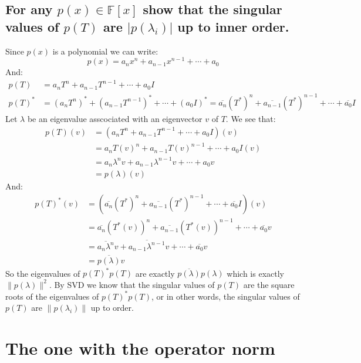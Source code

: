 \documentclass[11pt,a4paper]{article}
\theoremstyle{plain}
\newcommand{\F}{\mathbb{F}}
\begin{document}
	\subsection{For any $p(x)\in\F[x]$ show that the singular values of $p(T)$ 
	are $\vert p(\lambda_i)\vert$ up to inner order.}
	Since $p(x)$ is a polynomial we can write:
	\[
		p(x) = a_nx^n+a_{n-1}x^{n-1}+\cdots+a_0
	\]
	And:
	\begin{align*}
		p(T) &= a_nT^n+a_{n-1}T^{n-1}+\cdots+a_0I \\
		p(T)^* &= (a_nT^n)^* + (a_{n-1}T^{n-1})^* + \cdots + (a_0I)^* = 
		\overline{a_n}(T^*)^n + \overline{a_{n-1}}(T^*)^{n-1} + \cdots + 
		\overline{a_0}I
	\end{align*}
	Let $\lambda$ be an eigenvalue asscociated with an eigenvector $v$ of $T$. 
	We see that:
	\begin{align*}
		p(T)(v) &= (a_nT^n+a_{n-1}T^{n-1}+\cdots+a_0I)(v) \\ &= 
		a_nT(v)^n + a_{n-1}T(v)^{n-1} + \cdots + a_0I(v) \\ &= 
		a_n\lambda^{n}v + a_{n-1}\lambda^{n-1}v + \cdots + a_0v \\ &= 
		p(\lambda)(v)
	\end{align*}
	And:
	\begin{align*}
		p(T)^*(v) &= 
		(\overline{a_n}(T^*)^n + \overline{a_{n-1}}(T^*)^{n-1} + \cdots + 
		\overline{a_0}I)(v) \\ &=
		\overline{a_n}(T^*(v))^n + \overline{a_{n-1}}(T^*(v))^{n-1} + \cdots + 
		\overline{a_0}v\\ &=
		\overline{a_n\lambda^n}v + \overline{a_{n-1}\lambda^{n-1}}v + \cdots + 
		\overline{a_0}v\\ &=
		\overline{p(\lambda)}v
	\end{align*}
	So the eigenvalues of $p(T)^*p(T)$ are exactly 
	$\overline{p(\lambda)}p(\lambda)$ which is exactly $\|p(\lambda)\|^2$.
	By SVD we know that the singular values of $p(T)$ are the square roots
	of the eigenvalues of $p(T)^*p(T)$, or in other words, the singular values
	of $p(T)$ are $\|p(\lambda_i)\|$ up to order.
	
	\newpage
	
	\section{The one with the operator norm}
\end{document}
